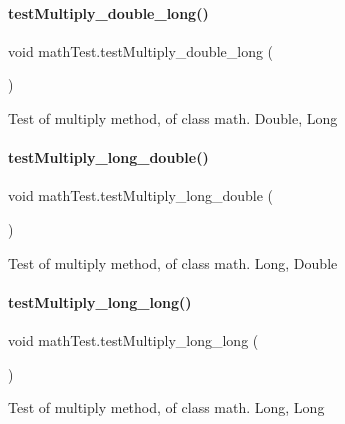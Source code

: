 \paragraph{\texorpdfstring{test\+Multiply\+\_\+double\+\_\+long()}{testMultiply\_double\_long()}}
{\footnotesize\ttfamily void math\+Test.\+test\+Multiply\+\_\+double\+\_\+long (\begin{DoxyParamCaption}{ }\end{DoxyParamCaption})\hspace{0.3cm}{\ttfamily [inline]}}

Test of multiply method, of class math. Double, Long \mbox{\label{classmathTest_a842730cc093ddf9b90d555e3ef719e54}} 
\paragraph{\texorpdfstring{test\+Multiply\+\_\+long\+\_\+double()}{testMultiply\_long\_double()}}
{\footnotesize\ttfamily void math\+Test.\+test\+Multiply\+\_\+long\+\_\+double (\begin{DoxyParamCaption}{ }\end{DoxyParamCaption})\hspace{0.3cm}{\ttfamily [inline]}}

Test of multiply method, of class math. Long, Double \mbox{\label{classmathTest_a9a2648892e6754d74c2a700705c7e527}} 
\paragraph{\texorpdfstring{test\+Multiply\+\_\+long\+\_\+long()}{testMultiply\_long\_long()}}
{\footnotesize\ttfamily void math\+Test.\+test\+Multiply\+\_\+long\+\_\+long (\begin{DoxyParamCaption}{ }\end{DoxyParamCaption})\hspace{0.3cm}{\ttfamily [inline]}}

Test of multiply method, of class math. Long, Long \mbox{\label{classmathTest_a0716cccf36e4e0cbc81338f47068cfe9}} 
